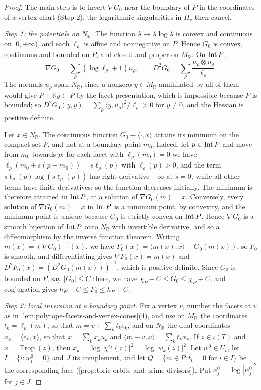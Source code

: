 \begin{proof}
The main step is to invert $\nabla G_0$ near the boundary of $P$ in the coordinates of a vertex chart (Step 2); the logarithmic singularities in $H_v$ then cancel.

\emph{Step 1: the potentials on $N_{\mathbb R}$.} The function $\lambda\mapsto\lambda\log\lambda$ is convex and continuous on $[0,+\infty)$, and each $\ell_\rho$ is affine and nonnegative on $P$. Hence $G_0$ is convex, continuous and bounded on $P$, and closed and proper on $M_{\mathbb R}$. On $\operatorname{Int} P$,
\[
 \nabla G_0=\sum_\rho(\log\ell_\rho+1)u_\rho,
 \qquad
 D^2G_0=\sum_\rho\frac{u_\rho\otimes u_\rho}{\ell_\rho}.
\]
The normals $u_\rho$ span $N_{\mathbb R}$, since a nonzero $y\in M_{\mathbb R}$ annihilated by all of them would give $P+\mathbb Ry\subset P$ by the facet presentation, which is impossible because $P$ is bounded; so $D^2G_0(y,y)=\sum_\rho\langle y,u_\rho\rangle^2/\ell_\rho>0$ for $y\neq0$, and the Hessian is positive definite.

Let $x\in N_{\mathbb R}$. The continuous function $G_0-\langle\cdot,x\rangle$ attains its minimum on the compact set $P$, and not at a boundary point $m_0$. Indeed, let $p\in\operatorname{Int} P$ and move from $m_0$ towards $p$: for each facet with $\ell_\rho(m_0)=0$ we have $\ell_\rho(m_0+s(p-m_0))=s\ell_\rho(p)$ with $\ell_\rho(p)>0$, and the term $s\ell_\rho(p)\log(s\ell_\rho(p))$ has right derivative $-\infty$ at $s=0$, while all other terms have finite derivatives; so the function decreases initially. The minimum is therefore attained in $\operatorname{Int} P$, at a solution of $\nabla G_0(m)=x$. Conversely, every solution of $\nabla G_0(m)=x$ in $\operatorname{Int} P$ is a minimum point, by convexity, and the minimum point is unique because $G_0$ is strictly convex on $\operatorname{Int} P$. Hence $\nabla G_0$ is a smooth bijection of $\operatorname{Int} P$ onto $N_{\mathbb R}$ with invertible derivative, and so a diffeomorphism by the inverse function theorem. Writing $m(x)=(\nabla G_0)^{-1}(x)$, we have $F_0(x)=\langle m(x),x\rangle-G_0(m(x))$, so $F_0$ is smooth, and differentiating gives $\nabla F_0(x)=m(x)$ and $D^2F_0(x)=(D^2G_0(m(x)))^{-1}$, which is positive definite. Since $G_0$ is bounded on $P$, say $|G_0|\leq C$ there, we have $\chi_P-C\leq G_0\leq\chi_P+C$, and conjugation gives $h_P-C\leq F_0\leq h_P+C$.

\emph{Step 2: local inversion at a boundary point.} Fix a vertex $v$, number the facets at $v$ as in \cref{lem:polytope-facets-and-vertex-cones}(4), and use on $M_{\mathbb R}$ the coordinates $t_k=\ell_k(m)$, so that $m=v+\sum_kt_ke_k$, and on $N_{\mathbb R}$ the dual coordinates $x_k=\langle e_k,x\rangle$, so that $x=\sum_kx_ku_k$ and $\langle m-v,x\rangle=\sum_kt_kx_k$. If $z\in\iota(T)$ and $x=\operatorname{Trop}(z)$, then $x_k=\log|\chi^{e_k}(z)|^2=\log|w_k(z)|^2$. Let $w^0\in U_v$, let $I=\{i:w^0_i=0\}$ and $J$ its complement, and let $Q=\{m\in P:t_i=0\text{ for }i\in I\}$ be the corresponding face (\cref{prop:toric-orbits-and-prime-divisors}). Put $x^0_j=\log|w^0_j|^2$ for $j\in J$.


\end{proof}
